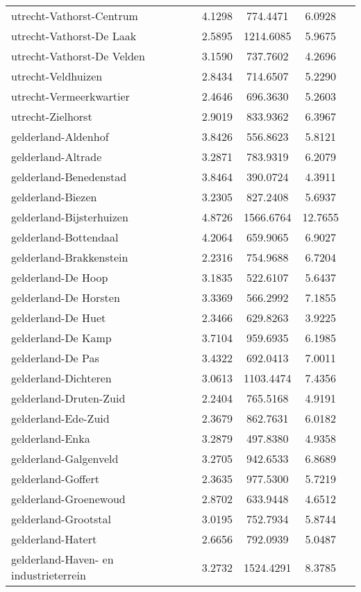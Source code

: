 \begin{longtable}{llccc}
utrecht-Vathorst-Centrum & 4.1298 & 774.4471 & 6.0928 \\
utrecht-Vathorst-De Laak & 2.5895 & 1214.6085 & 5.9675 \\
utrecht-Vathorst-De Velden & 3.1590 & 737.7602 & 4.2696 \\
utrecht-Veldhuizen & 2.8434 & 714.6507 & 5.2290 \\
utrecht-Vermeerkwartier & 2.4646 & 696.3630 & 5.2603 \\
utrecht-Zielhorst & 2.9019 & 833.9362 & 6.3967 \\
gelderland-Aldenhof & 3.8426 & 556.8623 & 5.8121 \\
gelderland-Altrade & 3.2871 & 783.9319 & 6.2079 \\
gelderland-Benedenstad & 3.8464 & 390.0724 & 4.3911 \\
gelderland-Biezen & 3.2305 & 827.2408 & 5.6937 \\
gelderland-Bijsterhuizen & 4.8726 & 1566.6764 & 12.7655 \\
gelderland-Bottendaal & 4.2064 & 659.9065 & 6.9027 \\
gelderland-Brakkenstein & 2.2316 & 754.9688 & 6.7204 \\
gelderland-De Hoop & 3.1835 & 522.6107 & 5.6437 \\
gelderland-De Horsten & 3.3369 & 566.2992 & 7.1855 \\
gelderland-De Huet & 2.3466 & 629.8263 & 3.9225 \\
gelderland-De Kamp & 3.7104 & 959.6935 & 6.1985 \\
gelderland-De Pas & 3.4322 & 692.0413 & 7.0011 \\
gelderland-Dichteren & 3.0613 & 1103.4474 & 7.4356 \\
gelderland-Druten-Zuid & 2.2404 & 765.5168 & 4.9191 \\
gelderland-Ede-Zuid & 2.3679 & 862.7631 & 6.0182 \\
gelderland-Enka & 3.2879 & 497.8380 & 4.9358 \\
gelderland-Galgenveld & 3.2705 & 942.6533 & 6.8689 \\
gelderland-Goffert & 2.3635 & 977.5300 & 5.7219 \\
gelderland-Groenewoud & 2.8702 & 633.9448 & 4.6512 \\
gelderland-Grootstal & 3.0195 & 752.7934 & 5.8744 \\
gelderland-Hatert & 2.6656 & 792.0939 & 5.0487 \\
gelderland-Haven- en industrieterrein & 3.2732 & 1524.4291 & 8.3785 \\

\end{longtable}
